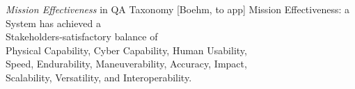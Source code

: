 \documentclass[xcolor=x11names,compress]{beamer}
\renewcommand{\(}{\begin{columns}}
\renewcommand{\)}{\end{columns}}
\newcommand{\<}[1]{\begin{column}{#1}}
\renewcommand{\>}{\end{column}}
\begin{document}


\begin{frame}{{\em Mission Effectiveness} in QA Taxonomy [Boehm, to app]}
Mission Effectiveness: a System has achieved a\\
\coqdocindent{1.50em} Stakeholders-satisfactory balance of\\
\coqdocindent{2.50em} Physical Capability, Cyber Capability, Human Usability, \\
\coqdocindent{2.50em} Speed, Endurability, Maneuverability, Accuracy, Impact, \\
\coqdocindent{2.50em} Scalability, Versatility, and Interoperability.
\end{frame}

\end{document}
